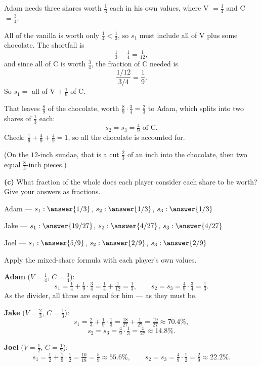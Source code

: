 \documentclass[12pt]{ximera}
\begin{document}
\begin{problem}
\begin{prompt}
\begin{solution}
Adam needs three shares worth $\frac13$ each in his own values, where V $= \frac14$ and
C $= \frac34$.

All of the vanilla is worth only $\frac14 < \frac13$, so $s_1$ must include all of V
plus some chocolate. The shortfall is
\[ \tfrac13 - \tfrac14 = \tfrac{1}{12}, \]
and since all of C is worth $\frac34$, the fraction of C needed is
\[ \frac{1/12}{3/4} = \frac19. \]
So $s_1 =$ all of V $+\ \frac19$ of C.

That leaves $\frac89$ of the chocolate, worth $\frac89 \cdot \frac34 = \frac23$ to
Adam, which splits into two shares of $\frac13$ each:
\[ s_2 = s_3 = \tfrac49 \text{ of C}. \]
Check: $\frac19+\frac49+\frac49 = 1$, so all the chocolate is accounted for. \checkmark

(On the $12$-inch sundae, that is a cut $\frac23$ of an inch into the chocolate, then
two equal $\frac{8}{3}$-inch pieces.)
\end{solution}
\end{prompt}

\begin{prompt}
\textbf{(c)} What fraction of the whole does each player consider each share to be
worth? Give your answers as fractions.

Adam --- $s_1: \answer{1/3}$, \quad $s_2: \answer{1/3}$, \quad $s_3: \answer{1/3}$

\smallskip
Jake --- $s_1: \answer{19/27}$, \quad $s_2: \answer{4/27}$, \quad $s_3: \answer{4/27}$

\smallskip
Joel --- $s_1: \answer{5/9}$, \quad $s_2: \answer{2/9}$, \quad $s_3: \answer{2/9}$

\begin{solution}
Apply the mixed-share formula with each player's own values.

\textbf{Adam} ($V=\frac14$, $C=\frac34$):
\[ s_1 = \tfrac14 + \tfrac19\cdot\tfrac34 = \tfrac14+\tfrac{1}{12} = \tfrac13,
\qquad s_2 = s_3 = \tfrac49\cdot\tfrac34 = \tfrac13. \]
As the divider, all three are equal for him --- as they must be.

\textbf{Jake} ($V=\frac23$, $C=\frac13$):
\[ s_1 = \tfrac23 + \tfrac19\cdot\tfrac13 = \tfrac{18}{27}+\tfrac{1}{27} = \tfrac{19}{27} \approx 70.4\%, \]
\[ s_2 = s_3 = \tfrac49\cdot\tfrac13 = \tfrac{4}{27} \approx 14.8\%. \]

\textbf{Joel} ($V=\frac12$, $C=\frac12$):
\[ s_1 = \tfrac12 + \tfrac19\cdot\tfrac12 = \tfrac{10}{18} = \tfrac59 \approx 55.6\%,
\qquad s_2 = s_3 = \tfrac49\cdot\tfrac12 = \tfrac29 \approx 22.2\%. \]


\end{solution}
\end{prompt}
\end{problem}
\end{document}

